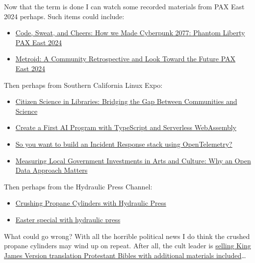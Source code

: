 Now that the term is done I can watch some recorded materials from PAX
East 2024 perhaps. Such items could include:

\begin{itemize}
\tightlist
\item
  \href{https://youtu.be/-_AIOjGyHgs}{Code, Sweat, and Cheers: How we
  Made Cyberpunk 2077: Phantom Liberty PAX East 2024}\\
\item
  \href{https://youtu.be/Yr1UJAdXfIM}{Metroid: A Community Retrospective
  and Look Toward the Future PAX East 2024}
\end{itemize}

Then perhaps from Southern California Linux Expo:

\begin{itemize}
\tightlist
\item
  \href{https://youtu.be/4xHUvDaRFs4}{Citizen Science in Libraries:
  Bridging the Gap Between Communities and Science}\\
\item
  \href{https://youtu.be/BoNrIx93vZE}{Create a First AI Program with
  TypeScript and Serverless WebAssembly}\\
\item
  \href{https://youtu.be/2byIS8wsoxA}{So you want to build an Incident
  Response stack using OpenTelemetry?}\\
\item
  \href{https://youtu.be/6mGmRoq6tWE}{Measuring Local Government
  Investments in Arts and Culture: Why an Open Data Approach Matters}
\end{itemize}

Then perhaps from the Hydraulic Press Channel:

\begin{itemize}
\tightlist
\item
  \href{https://youtu.be/EvWXq7rOlTo}{Crushing Propane Cylinders with
  Hydraulic Press}\\
\item
  \href{https://youtu.be/9qipt0yUKt8}{Easter special with hydraulic
  press}
\end{itemize}

What could go wrong? With all the horrible political news I do think the
crushed propane cylinders may wind up on repeat. After all, the cult
leader is
\href{https://www.msn.com/en-us/news/politics/donald-trump-is-selling-60-bibles-as-he-seeks-funds-for-for-campaign-legal-bills/ar-BB1kzJMI}{selling
King James Version translation Protestant Bibles with additional
materials included}\ldots{}
